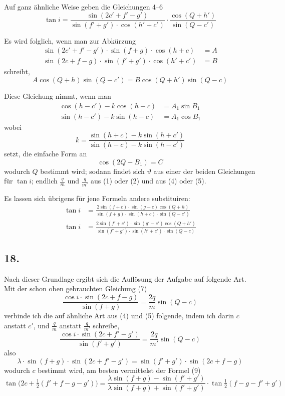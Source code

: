 \documentclass[12pt,a4paper]{article}
\begin{document}
Auf ganz ähnliche Weise geben die Gleichungen 4--6
\[ \tan i = \frac{\sin(2c' + f' - g')}{\sin(f' + g') \cdot \cos(h' + c')} \cdot \frac{\cos(Q + h')}{\sin(Q - c')} \]

Es wird folglich, wenn man zur Abkürzung
\begin{align*}
\sin(2c' + f' - g') \cdot \sin(f + g) \cdot \cos(h + c) &= A \\
\sin(2c + f - g) \cdot \sin(f' + g') \cdot \cos(h' + c') &= B
\end{align*}
schreibt,
\[ A \cos(Q + h) \sin(Q - c') = B \cos(Q + h') \sin(Q - c) \]

Diese Gleichung nimmt, wenn man
\begin{align*}
\cos(h - c') - k \cos(h - c) &= A_1 \sin B_1 \\
\sin(h - c') - k \sin(h - c) &= A_1 \cos B_1
\end{align*}
wobei
\[ k = \frac{\sin(h + c) - k \sin(h + c')}{\sin(h - c) - k \sin(h - c')} \]
setzt, die einfache Form an
\[ \cos(2Q - B_1) = C \]
wodurch $Q$ bestimmt wird; sodann findet sich $\vartheta$ aus einer der beiden Gleichungen für $\tan i$; endlich $\frac{q}{m}$ und $\frac{q}{m'}$ aus (1) oder (2) und aus (4) oder (5).

Es lassen sich übrigens für jene Formeln andere substituiren:
\begin{align*}
\tan i &= \frac{2 \sin(f + c) \cdot \sin(g - c) \cos(Q + h)}{\sin(f + g) \cdot \sin(h + c) \cdot \sin(Q - c')} \\
\tan i &= \frac{2 \sin(f' + c') \cdot \sin(g' - c') \cos(Q + h')}{\sin(f' + g') \cdot \sin(h' + c') \cdot \sin(Q - c)}
\end{align*}

\subsection*{18.}
Nach dieser Grundlage ergibt sich die Auflösung der Aufgabe auf folgende Art. Mit der schon oben gebrauchten Gleichung (7)
\[ \frac{\cos i \cdot \sin(2c + f - g)}{\sin(f + g)} = \frac{2q}{m} \sin(Q - c) \]
verbinde ich die auf ähnliche Art aus (4) und (5) folgende, indem ich darin $c$ anstatt $c'$, und $\frac{q}{m}$ anstatt $\frac{q}{m'}$ schreibe,
\[ \frac{\cos i \cdot \sin(2c + f' - g')}{\sin(f' + g')} = \frac{2q}{m'} \sin(Q - c) \tag{8} \]
also
\[ \lambda \cdot \sin(f + g) \cdot \sin(2c + f' - g') = \sin(f' + g') \cdot \sin(2c + f - g) \]
wodurch $c$ bestimmt wird, am besten vermittelst der Formel (9)
\[ \tan\bigl(2c + \tfrac{1}{2}(f' + f - g - g')\bigr) = \frac{\lambda \sin(f + g) - \sin(f' + g')}{\lambda \sin(f + g) + \sin(f' + g')} \cdot \tan\tfrac{1}{2}(f - g - f' + g') \]
\end{document}
